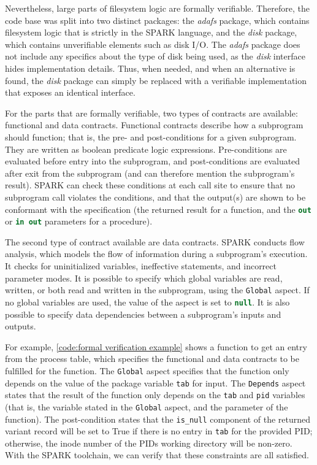 Nevertheless, large parts of filesystem logic are formally verifiable.
Therefore, the code base was split into two distinct packages: the \textit{adafs} package, which contains filesystem logic that is strictly in the SPARK language, and the \textit{disk} package, which contains unverifiable elements such as disk I/O.
The \textit{adafs} package does not include any specifics about the type of disk being used, as the \textit{disk} interface hides implementation details.
Thus, when needed, and when an alternative is found, the \textit{disk} package can simply be replaced with a verifiable implementation that exposes an identical interface.

For the parts that are formally verifiable, two types of contracts are available: functional and data contracts.
Functional contracts describe how a subprogram should function; that is, the pre- and post-conditions for a given subprogram.
They are written as boolean predicate logic expressions.
Pre-conditions are evaluated before entry into the subprogram, and post-conditions are evaluated after exit from the subprogram (and can therefore mention the subprogram's result).
SPARK can check these conditions at each call site to ensure that no subprogram call violates the conditions, and that the output(s) are shown to be conformant with the specification (the returned result for a function, and the \lstinline[language=Ada]{out} or \lstinline[language=Ada]{in out} parameters for a procedure).

The second type of contract available are data contracts.
SPARK conducts flow analysis, which models the flow of information during a subprogram's execution.
It checks for uninitialized variables, ineffective statements, and incorrect parameter modes.
It is possible to specify which global variables are read, written, or both read and written in the subprogram, using the \lstinline[language=Ada]{Global} aspect.
If no global variables are used, the value of the aspect is set to \lstinline[language=Ada]{null}.
It is also possible to specify data dependencies between a subprogram's inputs and outputs.

For example, \autoref{code:formal verification example} shows a function to get an entry from the process table, which specifies the functional and data contracts to be fulfilled for the function.
The \lstinline[language=Ada]{Global} aspect specifies that the function only depends on the value of the package variable \lstinline[language=Ada]{tab} for input.
The \lstinline[language=Ada]{Depends} aspect states that the result of the function only depends on the \lstinline[language=Ada]{tab} and \lstinline[language=Ada]{pid} variables (that is, the variable stated in the \lstinline[language=Ada]{Global} aspect, and the parameter of the function).
The post-condition states that the \lstinline[language=Ada]{is_null} component of the returned variant record will be set to True if there is no entry in \lstinline[language=Ada]{tab} for the provided PID; otherwise, the inode number of the PIDs working directory will be non-zero.
With the SPARK toolchain, we can verify that these constraints are all satisfied.

